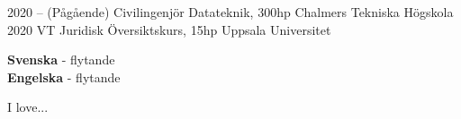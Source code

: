 \documentclass[9pt]{developercv} %
\begin{document}


\begin{entrylist}
	\entry
		{2020 -- }
		{(Pågående) Civilingenjör Datateknik, 300hp}
		{Chalmers Tekniska Högskola}
		{}
	\entry
		{2020 VT}
		{Juridisk Översiktskurs, 15hp}
		{Uppsala Universitet}
		{}
\end{entrylist}


\begin{minipage}[t]{0.3\textwidth}
	\vspace{-\baselineskip} %

	
	\textbf{Svenska} - flytande\\
	\textbf{Engelska} - flytande
\end{minipage}
\hfill
\begin{minipage}[t]{0.6\textwidth}
	\vspace{-\baselineskip} %
	
	
	I love... \lorem
\end{minipage}

\end{document}
